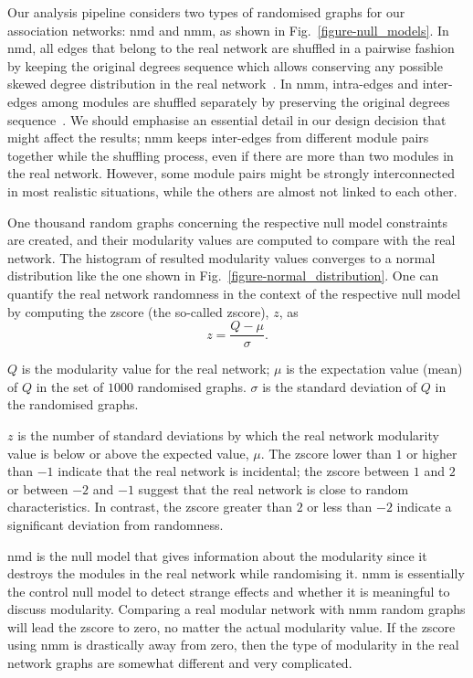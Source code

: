 Our analysis pipeline considers two types of randomised graphs for our association networks: \ac{nmd} and \ac{nmm}, as shown in Fig.~\ref{figure-null_models}. In \acs{nmd}, all edges that belong to the real network are shuffled in a pairwise fashion by keeping the original degrees sequence which allows conserving any possible skewed degree distribution in the real network~\cite{Maslov910, Fretter2012, FORTUNATO201075}. In \acs{nmm}, intra-edges and inter-edges among modules are shuffled separately by preserving the original degrees sequence~\cite{Fretter2012}. We should emphasise an essential detail in our design decision that might affect the results; \acs{nmm} keeps inter-edges from different module pairs together while the shuffling process, even if there are more than two modules in the real network. However, some module pairs might be strongly interconnected in most realistic situations, while the others are almost not linked to each other.


One thousand random graphs concerning the respective null model constraints are created, and their modularity values are computed to compare with the real network. The histogram of resulted modularity values converges to a normal distribution like the one shown in Fig.~\ref{figure-normal_distribution}. One can quantify the real network randomness in the context of the respective null model by computing the \acl{zscore} (the so-called \acs{zscore}), $z$, as
\begin{equation} %
	z = \frac{Q-\mu}{\sigma}.
	\label{zscore}
\end{equation} 

$Q$ is the modularity value for the real network; $\mu$ is the expectation value (mean) of $Q$ in the set of $1000$ randomised graphs. $\sigma$ is the standard deviation of $Q$ in the randomised graphs.

$z$ is the number of standard deviations by which the real network modularity value is below or above the expected value, $\mu$. The \acs{zscore} lower than $1$ or higher than $-1$ indicate that the real network is incidental; the \acs{zscore} between $1$ and $2$ or between $-2$ and $-1$ suggest that the real network is close to random characteristics. In contrast, the \acs{zscore} greater than $2$ or less than $-2$ indicate a significant deviation from randomness.

\acs{nmd} is the null model that gives information about the modularity since it destroys the modules in the real network while randomising it. \acs{nmm} is essentially the control null model to detect strange effects and whether it is meaningful to discuss modularity. Comparing a real modular network with \acs{nmm} random graphs will lead the \acs{zscore} to zero, no matter the actual modularity value. If the \acs{zscore} using \acs{nmm} is drastically away from zero, then the type of modularity in the real network graphs are somewhat different and very complicated.


